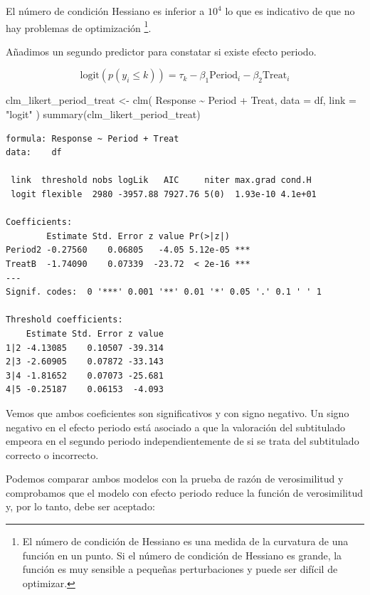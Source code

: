 \documentclass[
  letterpaper,
  DIV=11,
  numbers=noendperiod]{scrartcl}
\newenvironment{Shaded}{\begin{snugshade}}{\end{snugshade}}
\newcommand{\AttributeTok}[1]{\textcolor[rgb]{0.40,0.45,0.13}{#1}}
\newcommand{\FunctionTok}[1]{\textcolor[rgb]{0.28,0.35,0.67}{#1}}
\newcommand{\NormalTok}[1]{\textcolor[rgb]{0.00,0.23,0.31}{#1}}
\newcommand{\OtherTok}[1]{\textcolor[rgb]{0.00,0.23,0.31}{#1}}
\newcommand{\SpecialCharTok}[1]{\textcolor[rgb]{0.37,0.37,0.37}{#1}}
\newcommand{\StringTok}[1]{\textcolor[rgb]{0.13,0.47,0.30}{#1}}
\begin{document}
El número de condición Hessiano es inferior a \(10^4\) lo que es
indicativo de que no hay problemas de optimización \footnote{El número
  de condición de Hessiano es una medida de la curvatura de una función
  en un punto. Si el número de condición de Hessiano es grande, la
  función es muy sensible a pequeñas perturbaciones y puede ser difícil
  de optimizar.}.

Añadimos un segundo predictor para constatar si existe efecto periodo.

\[
\text{logit}(p(y_i \leq k)) = \tau_k - \beta_1 \text{Period}_i - \beta_2 \text{Treat}_i
\]

\begin{Shaded}
\begin{Highlighting}[]
\NormalTok{clm\_likert\_period\_treat }\OtherTok{\textless{}{-}}
    \FunctionTok{clm}\NormalTok{(}
\NormalTok{        Response }\SpecialCharTok{\textasciitilde{}}\NormalTok{ Period }\SpecialCharTok{+}\NormalTok{ Treat,}
        \AttributeTok{data =}\NormalTok{ df, }\AttributeTok{link =} \StringTok{"logit"}
\NormalTok{    )}
\FunctionTok{summary}\NormalTok{(clm\_likert\_period\_treat)}
\end{Highlighting}
\end{Shaded}

\begin{verbatim}
formula: Response ~ Period + Treat
data:    df

 link  threshold nobs logLik   AIC     niter max.grad cond.H 
 logit flexible  2980 -3957.88 7927.76 5(0)  1.93e-10 4.1e+01

Coefficients:
        Estimate Std. Error z value Pr(>|z|)    
Period2 -0.27560    0.06805   -4.05 5.12e-05 ***
TreatB  -1.74090    0.07339  -23.72  < 2e-16 ***
---
Signif. codes:  0 '***' 0.001 '**' 0.01 '*' 0.05 '.' 0.1 ' ' 1

Threshold coefficients:
    Estimate Std. Error z value
1|2 -4.13085    0.10507 -39.314
2|3 -2.60905    0.07872 -33.143
3|4 -1.81652    0.07073 -25.681
4|5 -0.25187    0.06153  -4.093
\end{verbatim}

Vemos que ambos coeficientes son significativos y con signo negativo. Un
signo negativo en el efecto periodo está asociado a que la valoración
del subtitulado empeora en el segundo periodo independientemente de si
se trata del subtitulado correcto o incorrecto.

Podemos comparar ambos modelos con la prueba de razón de verosimilitud y
comprobamos que el modelo con efecto periodo reduce la función de
verosimilitud y, por lo tanto, debe ser aceptado:
\end{document}

